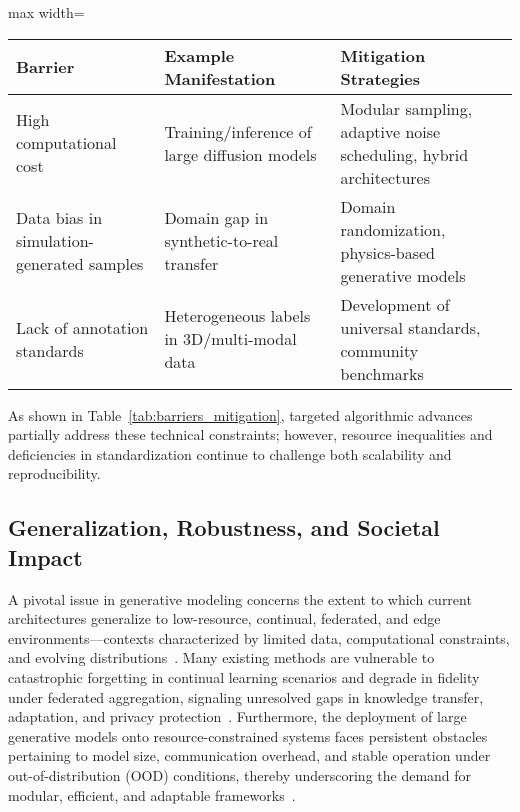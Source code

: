 \begin{table*}[htbp]
\centering
\caption{Technical barriers and mitigation strategies for large-scale generative models}
\label{tab:barriers_mitigation}
\begin{adjustbox}{max width=\textwidth}
\begin{tabular}{lll}
\toprule
\textbf{Barrier} & \textbf{Example Manifestation} & \textbf{Mitigation Strategies} \\
\midrule
High computational cost & Training/inference of large diffusion models & Modular sampling, adaptive noise scheduling, hybrid architectures \\
Data bias in simulation-generated samples & Domain gap in synthetic-to-real transfer & Domain randomization, physics-based generative models \\
Lack of annotation standards & Heterogeneous labels in 3D/multi-modal data & Development of universal standards, community benchmarks \\
\bottomrule
\end{tabular}
\end{adjustbox}
\end{table*}

As shown in Table~\ref{tab:barriers_mitigation}, targeted algorithmic advances partially address these technical constraints; however, resource inequalities and deficiencies in standardization continue to challenge both scalability and reproducibility.

\subsection{Generalization, Robustness, and Societal Impact}

A pivotal issue in generative modeling concerns the extent to which current architectures generalize to low-resource, continual, federated, and edge environments—contexts characterized by limited data, computational constraints, and evolving distributions~\cite{ref72,ref73}. Many existing methods are vulnerable to catastrophic forgetting in continual learning scenarios and degrade in fidelity under federated aggregation, signaling unresolved gaps in knowledge transfer, adaptation, and privacy protection~\cite{ref73}. Furthermore, the deployment of large generative models onto resource-constrained systems faces persistent obstacles pertaining to model size, communication overhead, and stable operation under out-of-distribution (OOD) conditions, thereby underscoring the demand for modular, efficient, and adaptable frameworks~\cite{ref73,ref74,ref88}.

